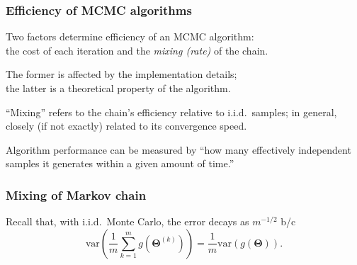 \documentclass[18pt]{beamer}
\newcommand{\titleSmallCap}[1]{{\fontsize{12}{14}\selectfont  \MakeUppercase{#1}}}
\DeclareMathOperator{\density}{\pi}
\newcommand{\randVar}{\Theta}
\newcommand{\mcmc}{{\small MCMC}}
\newcommand{\mcIndex}{k}
\newcommand{\mcSampleSize}{m}
\begin{document}
\renewcommand{\frametitleText}{Efficiency of \titleSmallCap{MCMC} algorithms}
\begin{frame}
\frametitle{\frametitleText}

Two factors determine efficiency of an \mcmc{} algorithm:\\ 
the cost of each iteration %
and the \textit{mixing (rate)} of the chain.

\pause
\smallskip
The former is affected by the implementation details; \\ 
the latter is a theoretical property of the algorithm.

\pause
\smallskip
``Mixing'' refers to the chain's efficiency relative to i.i.d.\ samples;
in general, closely (if not exactly) related to its convergence speed. 

\pause
\smallskip
Algorithm performance can be measured by ``how many effectively independent samples it generates within a given amount of time.''

\end{frame}


\renewcommand{\frametitleText}{Mixing of Markov chain}
\begin{frame}
\frametitle{\frametitleText}
Recall that, with i.i.d.\ Monte Carlo,
the error decays as $\mcSampleSize^{-1/2}$ b/c 
$$\mathrm{var} \!\left( \frac{1}{\mcSampleSize} \sum_{\mcIndex = 1}^\mcSampleSize g\left( \bm{\randVar}^{(\mcIndex)} \right) \right)
	= \frac{1}{\mcSampleSize} 
	\mathrm{var} \! \left( g \!\left( \bm{\randVar} \right) \right).$$
\end{frame}
\end{document}
